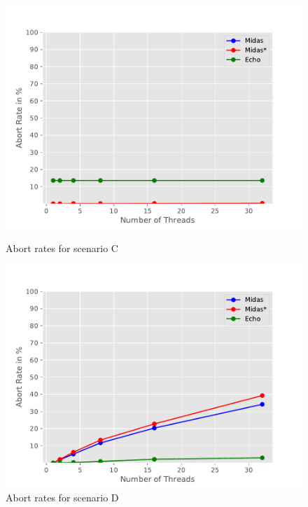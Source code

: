 \begin{figure}
\begin{minipage}[l]{0.50\textwidth}
        \includegraphics[width=\textwidth]{figures/bench/ar-ls}
        \caption{Abort rates for scenario C}
\end{minipage}
\begin{minipage}[l]{0.50\textwidth}
        \includegraphics[width=\textwidth]{figures/bench/ar-ll}
        \caption{Abort rates for scenario D}
\end{minipage}
\end{figure}

